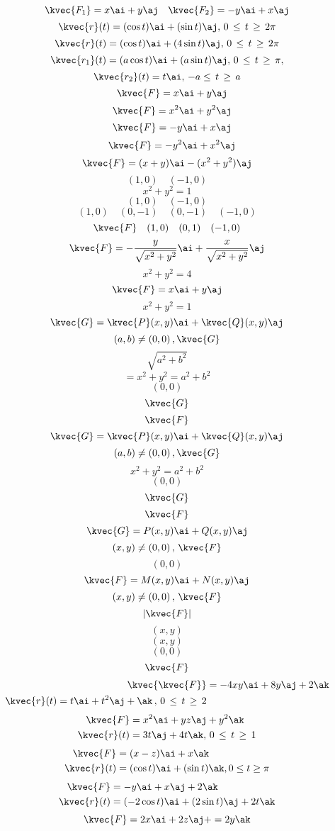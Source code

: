 \[\kvec{F_{1}}=x\ai + y\aj \quad \kvec{F_{2}}=-y\ai +x\aj\]
\[\kvec{r}(t)=(\cos t)\ai +(\sin t)\aj , \, 0\, \le \, t\, \ge \, 2\pi\]
\[\kvec{r}(t)=(\cos t)\ai +(4\sin t )\aj,\,0\, \le \, t\, \ge \, 2\pi\]
\[\kvec{r_{1}}(t)=(a\cos t)\ai +(a\sin t)\aj , \, 0\, \le \, t \, \ge \, \pi,\]
\[\kvec{r_{2}}(t)= t\ai, \, -a\le \, t \, \ge \, a\]
\[\quad \kvec{F}=x\ai + y\aj\]
\[\quad \kvec{F}= x^{2} \ai + y^{2} \aj	\]
\[\quad \kvec{F}=-y \ai + x\aj\]
\[\quad \kvec{F}=-y^{2}\ai + x^{2}\aj\]
\[\kvec{F} = (x+y)\ai - (x^{2}+y^{2})\aj\]
\[(1,0)\quad (-1,0)\]
\[x^{2}+y^{2}=1\]
\[(1,0)\quad (-1,0)\]
\[(1,0)\quad (0,-1)\quad (0,-1)\quad (-1,0)\]
\[\kvec{F} \quad (1,0)\quad (0,1)\quad (-1,0)\]
\[\kvec{F}=-\frac{y}{\sqrt{x^{2}+y^{2}}} \ai + \frac{x}{\sqrt{x^{2}+y^{2}}}\aj\]
\[x^{2}+y^{2}=4\]
\[\kvec{F}=x\ai + y\aj\]
\[x^{2}+y^{2}=1\]
\[\kvec{G}=\kvec{P}(x,y)\ai + \kvec{Q}(x,y)\aj	\]
\[(a,b) \neq (0,0)\, , \kvec{G}\]
\[\sqrt{a^{2}+b^{2}}\]
\[=x^{2}+y^{2}=a^{2}+b^{2}\]
\[(0,0)\]
\[\kvec{G}\]
\[\kvec{F}\]
\[\kvec{G}=\kvec{P}(x,y)\ai + \kvec{Q}(x,y)\aj	\]
\[(a,b) \neq (0,0)\, , \kvec{G}\]
\[x^{2}+y^{2}=a^{2}+b^{2}\]
\[(0,0)\]
\[\kvec{G}\]
\[\kvec{F}\]
\[\kvec{G}=P(x,y)\ai+Q(x,y)\aj\]
\[(x,y)\neq (0,0)	\, , \, \kvec{F}\]
\[(0,0)\]
\[\kvec{F}=M(x,y)\ai +N(x,y)\aj\]
\[(x,y)\neq (0,0)\, , \, \kvec{F}\]
\[|\kvec{F}|\]
\[(x,y)\]
\[(x,y)\]
\[(0,0)\]
\[\kvec{F}\]
\begin{align*}
\kvec{\kvec{F}} &=-4xy\ai+8y\aj +2\ak \\
\kvec{r}(t)=t\ai +t^{2}\aj +\ak \, , \, 0\, \le \, t\, \ge \, 2
\end{align*}
\begin{align*}
\kvec{F}&=x^{2}\ai +yz\aj + y^{2}\ak\\
\kvec{r}(t)&=3t\aj + 4t{\ak} , \, 0\, \le \, t \, \ge \, 1
\end{align*}
\begin{align*}
\kvec{F}&=(x-z)\ai +x\ak\\
\kvec{r}(t)&=(\cos t)\ai + (\sin t)\ak, 0\le t \ge \pi
\end{align*}
\begin{align*}
\kvec{F}&=-y\ai+ x\aj +2\ak\\
\kvec{r}(t)&=(-2\cos t)\ai + (2\sin t)\aj + 2t\ak
\end{align*}
\[\kvec{F}=2x\ai+2z\aj+=2y\ak\]
